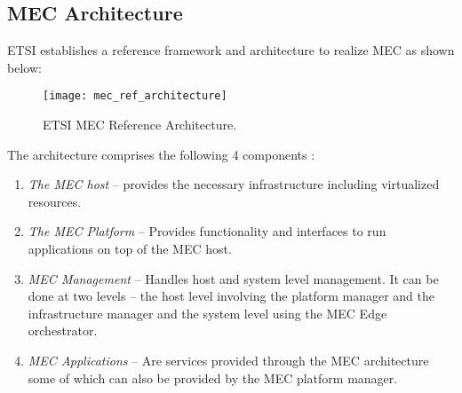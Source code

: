 \subsection{MEC Architecture}

ETSI establishes a reference framework and architecture to realize MEC as shown below:

\begin{figure}[h!]
    \centering
    \texttt{[image: mec\_ref\_architecture]}
    \label{fig:4}
    \caption{ETSI MEC Reference Architecture. \protect\cite{etsimec03}}
\end{figure}

The architecture comprises the following 4 components \cite{etsimec03}:
\begin{enumerate}
    \item \textit{The MEC host} – provides the necessary infrastructure including virtualized resources.
    \item \textit{The MEC Platform} – Provides functionality and interfaces to run applications on top of the MEC host.
    \item \textit{MEC Management} – Handles host and system level management. It can be done at two levels – the host level involving the platform manager and the infrastructure manager and the system level using the MEC Edge orchestrator.
    \item \textit{MEC Applications} – Are services provided through the MEC architecture some of which can also be provided by the MEC platform manager.
\end{enumerate}
